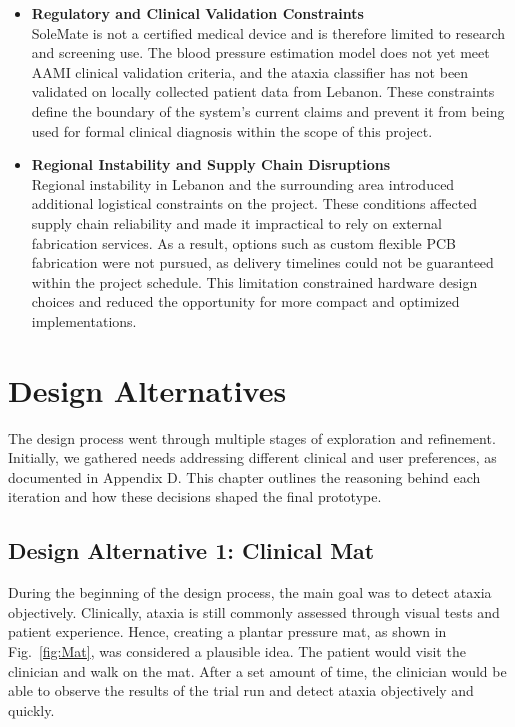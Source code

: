 \begin{itemize}
    \item \textbf{Regulatory and Clinical Validation Constraints}\\
    SoleMate is not a certified medical device and is therefore limited to research and screening use. The blood pressure estimation model does not yet meet AAMI clinical validation criteria, and the ataxia classifier has not been validated on locally collected patient data from Lebanon. These constraints define the boundary of the system's current claims and prevent it from being used for formal clinical diagnosis within the scope of this project.
    \item \textbf{Regional Instability and Supply Chain Disruptions}\\
    Regional instability in Lebanon and the surrounding area introduced additional logistical constraints on the project. These conditions affected supply chain reliability and made it impractical to rely on external fabrication services. As a result, options such as custom flexible PCB fabrication were not pursued, as delivery timelines could not be guaranteed within the project schedule. This limitation constrained hardware design choices and reduced the opportunity for more compact and optimized implementations.
    \end{itemize}

\section{Design Alternatives}
The design process went through multiple stages of exploration and refinement. Initially, we gathered needs addressing different clinical and user preferences, as documented in Appendix D. This chapter outlines the reasoning behind each iteration and how these decisions shaped the final prototype. 

\subsection{Design Alternative 1: Clinical Mat}
During the beginning of the design process, the main goal was to detect ataxia objectively. Clinically, ataxia is still commonly assessed through visual tests and patient experience. Hence, creating a plantar pressure mat, as shown in Fig.~\ref{fig:Mat}, was considered a plausible idea. The patient would visit the clinician and walk on the mat. After a set amount of time, the clinician would be able to observe the results of the trial run and detect ataxia objectively and quickly.\\

